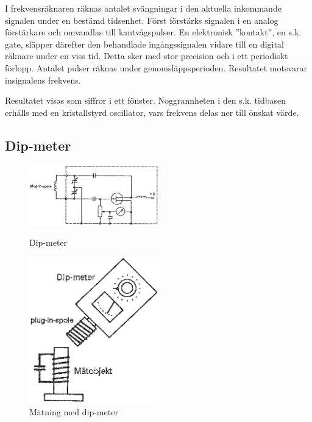 I frekvensräknaren räknas antalet svängningar i den aktuella
inkommande signalen under en bestämd tidsenhet. Först förstärks
signalen i en analog förstärkare och omvandlas till kantvågspulser. En
elektronisk ''kontakt'', en s.k. gate, släpper därefter den behandlade
ingångssignalen vidare till en digital räknare under en viss
tid. Detta sker med stor precision och i ett periodiskt
förlopp. Antalet pulser räknas under genomsläppsperioden. Resultatet
motsvarar insignalens frekvens.

Resultatet visas som siffror i ett fönster. Noggrannheten i den
s.k. tidbasen erhålls med en kristallstyrd oscillator, vars frekvens
delas ner till önskat värde.

\subsection{Dip-meter}

\begin{figure}
  \includegraphics[width=0.5\textwidth]{images/cropped_pdfs/bild_2_8-12.pdf}
  \caption{Dip-meter}
  \label{fig:bildII8-12}

  \includegraphics[width=0.5\textwidth]{images/cropped_pdfs/bild_2_8-13.pdf}
  \caption{Mätning med dip-meter}
  \label{fig:bildII8-13}
\end{figure}

